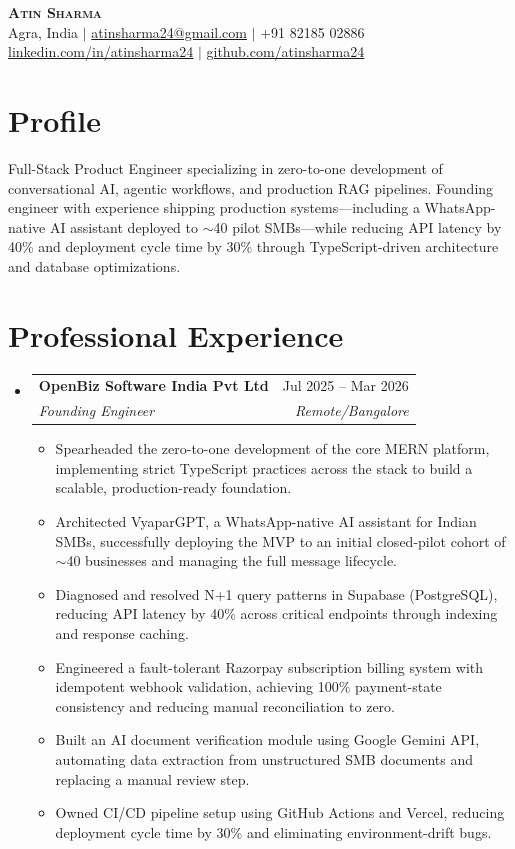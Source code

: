 \documentclass[a4paper,10pt]{article}
\makeatletter
\newcommand{\resumeItem}[1]{
  \item\small{
    {#1 \vspace{-2pt}}
  }
}
\newcommand{\resumeSubheading}[4]{
  \vspace{-2pt}\item
    \begin{tabular*}{\textwidth}{l@{\extracolsep{\fill}}r}
      \textbf{#1} & #2 \\
      \textit{\small#3} & \textit{\small #4} \\
    \end{tabular*}\vspace{-7pt}
}
\newcommand{\resumeSubHeadingListStart}{\begin{itemize}[leftmargin=0.15in, label={}]}
\newcommand{\resumeSubHeadingListEnd}{\end{itemize}}
\newcommand{\resumeItemListStart}{\begin{itemize}}
\newcommand{\resumeItemListEnd}{\end{itemize}\vspace{-5pt}}
\makeatother
\begin{document}
\begin{center}
    \textbf{\Huge \scshape Atin Sharma} \\ \vspace{1pt}
    \small Agra, India $|$ \href{mailto:atinsharma24@gmail.com}{atinsharma24@gmail.com} $|$ +91 82185 02886 \\
    \href{https://linkedin.com/in/atinsharma24}{\underline{linkedin.com/in/atinsharma24}} $|$ 
    \href{https://github.com/atinsharma24}{\underline{github.com/atinsharma24}}
\end{center}

\section{Profile}
\small{Full-Stack Product Engineer specializing in zero-to-one development of conversational AI, agentic workflows, and production RAG pipelines. Founding engineer with experience shipping production systems—including a WhatsApp-native AI assistant deployed to $\sim$40 pilot SMBs—while reducing API latency by 40\% and deployment cycle time by 30\% through TypeScript-driven architecture and database optimizations.}

\section{Professional Experience}
  \resumeSubHeadingListStart
    \resumeSubheading
      {OpenBiz Software India Pvt Ltd}{Jul 2025 -- Mar 2026}
      {Founding Engineer}{Remote/Bangalore}
      \resumeItemListStart
        \resumeItem{Spearheaded the zero-to-one development of the core MERN platform, implementing strict TypeScript practices across the stack to build a scalable, production-ready foundation.}
        \resumeItem{Architected VyaparGPT, a WhatsApp-native AI assistant for Indian SMBs, successfully deploying the MVP to an initial closed-pilot cohort of $\sim$40 businesses and managing the full message lifecycle.}
        \resumeItem{Diagnosed and resolved N+1 query patterns in Supabase (PostgreSQL), reducing API latency by 40\% across critical endpoints through indexing and response caching.}
        \resumeItem{Engineered a fault-tolerant Razorpay subscription billing system with idempotent webhook validation, achieving 100\% payment-state consistency and reducing manual reconciliation to zero.}
        \resumeItem{Built an AI document verification module using Google Gemini API, automating data extraction from unstructured SMB documents and replacing a manual review step.}
        \resumeItem{Owned CI/CD pipeline setup using GitHub Actions and Vercel, reducing deployment cycle time by 30\% and eliminating environment-drift bugs.}
      \resumeItemListEnd
  \resumeSubHeadingListEnd
\end{document}
